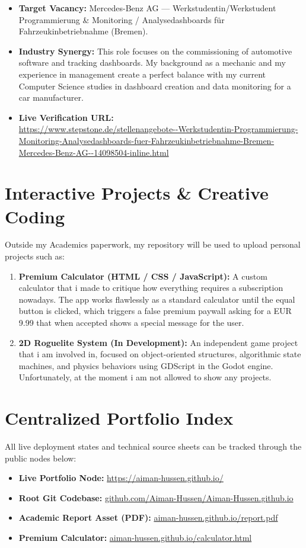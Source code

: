 \documentclass[11pt,a4paper]{article}
\begin{document}
\begin{itemize}
    \item \textbf{Target Vacancy:} Mercedes-Benz AG — Werkstudentin/Werkstudent Programmierung \& Monitoring / Analysedashboards für Fahrzeukinbetriebnahme (Bremen).
    \item \textbf{Industry Synergy:} This role focuses on the commissioning of automotive software and tracking dashboards. My background as a mechanic and my experience in management create a perfect balance with my current Computer Science studies in dashboard creation and data monitoring for a car manufacturer.
    \item \textbf{Live Verification URL:} \\
    \url{https://www.stepstone.de/stellenangebote--Werkstudentin-Programmierung-Monitoring-Analysedashboards-fuer-Fahrzeukinbetriebnahme-Bremen-Mercedes-Benz-AG--14098504-inline.html}
\end{itemize}

\section{Interactive Projects \& Creative Coding}
Outside my Academics paperwork, my repository will be used to upload personal projects such as:

\begin{enumerate}
    \item \textbf{Premium Calculator (HTML / CSS / JavaScript):} A custom calculator that i made to critique how everything requires a subscription nowadays. The app works flawlessly as a standard calculator until the equal button is clicked, which triggers a false premium paywall asking for a EUR 9.99 that when accepted shows a special message for the user.
    \item \textbf{2D Roguelite System (In Development):} An independent game project that i am involved in, focused on object-oriented structures, algorithmic state machines, and physics behaviors using GDScript in the Godot engine. Unfortunately, at the moment i am not allowed to show any projects.
\end{enumerate}

\section{Centralized Portfolio Index}
All live deployment states and technical source sheets can be tracked through the public nodes below:
\begin{itemize}
    \item \textbf{Live Portfolio Node:} \href{https://aiman-hussen.github.io/}{https://aiman-hussen.github.io/}
    \item \textbf{Root Git Codebase:} \href{https://github.com/Aiman-Hussen/Aiman-Hussen.github.io}{github.com/Aiman-Hussen/Aiman-Hussen.github.io}
    \item \textbf{Academic Report Asset (PDF):} \href{https://aiman-hussen.github.io/report.pdf}{aiman-hussen.github.io/report.pdf}
     \item \textbf{Premium Calculator:} \href{https://aiman-hussen.github.io/calculator.html}{aiman-hussen.github.io/calculator.html}
\end{itemize}
\end{document}

